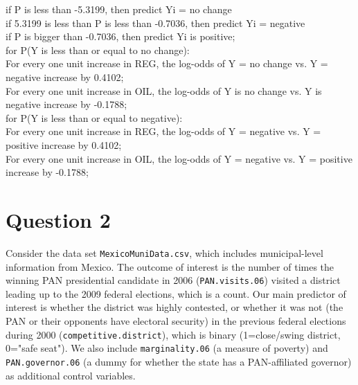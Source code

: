 \documentclass[12pt,letterpaper]{article}
\begin{document}
\begin{enumerate}
	if P is less than -5.3199, then predict Yi = no change\\
	if  5.3199 is less than P is less than  -0.7036, then predict Yi = negative\\
	if P is bigger than  -0.7036, then predict Yi is positive;\\
	
	for P(Y is less than or equal to  no change):\\
	For every one unit increase in REG, the log-odds of Y = no change vs. Y = negative increase by 0.4102;\\
	For every one unit increase in OIL, the log-odds of Y is no change vs. Y is negative increase by -0.1788;\\
	
	
	for P(Y is less than or equal to negative):\\
	For every one unit increase in REG, the log-odds of Y = negative vs. Y = positive increase by 0.4102;\\
	For every one unit increase in OIL, the log-odds of Y = negative vs. Y = positive increase by -0.1788;\\
	
	
	
\end{enumerate}

\section*{Question 2} 
\vspace{.25cm}

\noindent Consider the data set \texttt{MexicoMuniData.csv}, which includes municipal-level information from Mexico. The outcome of interest is the number of times the winning PAN presidential candidate in 2006 (\texttt{PAN.visits.06}) visited a district leading up to the 2009 federal elections, which is a count. Our main predictor of interest is whether the district was highly contested, or whether it was not (the PAN or their opponents have electoral security) in the previous federal elections during 2000 (\texttt{competitive.district}), which is binary (1=close/swing district, 0="safe seat"). We also include \texttt{marginality.06} (a measure of poverty) and \texttt{PAN.governor.06} (a dummy for whether the state has a PAN-affiliated governor) as additional control variables. 
\end{document}
